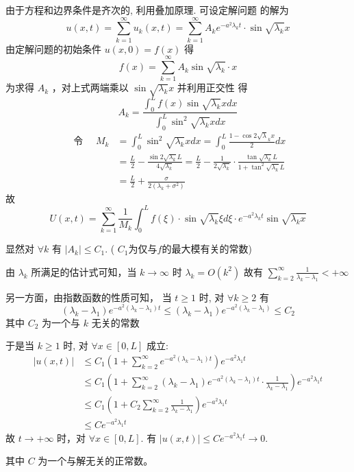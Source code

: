 \begin{questions}
\begin{solution}
由于方程和边界条件是齐次的, 利用叠加原理. 可设定解问题
的解为 $$ u(x, t)=\sum_{k=1}^{\infty} u_{k}(x, t)=\sum_{k=1}^{\infty} A_{k} e^{-a^{2} \lambda_{k} t} \cdot \sin \sqrt{\lambda_{k}} x $$
由定解问题的初始条件 $ u(x, 0)=f(x) $
得 $$ f(x)=\sum_{k=1}^{\infty} A_{k} \sin \sqrt{\lambda_{k}} \cdot x $$
为求得 $ A_{k} $ ，对上式两端乘以 $ \sin \sqrt{\lambda_{k}} x $ 并利用正交性
得 $$ A_{k}=\frac{\int_{0}^{L} f(x) \sin \sqrt{\lambda_{k}} x d x}{\int_{0}^{L} \sin ^{2} \sqrt{\lambda_{k}} x d x} $$
$$
\begin{aligned}
\text { 令 } \quad M_{k} & =\int_{0}^{L} \sin ^{2} \sqrt{\lambda_{k}} x d x=\int_{0}^{L} \frac{1-\cos 2 \sqrt{\lambda}_{k} x}{2} d x \\
& =\frac{L}{2}-\frac{\sin 2 \sqrt{\lambda_{k}} L}{4 \sqrt{\lambda_{k}}}=\frac{L}{2}-\frac{1}{2 \sqrt{\lambda_{k}}} \cdot \frac{\tan \sqrt{\lambda_{k}} L}{1+\tan ^{2} \sqrt{\lambda_{k}} L} \\
& =\frac{L}{2}+\frac{\sigma}{2\left(\lambda_{k}+\sigma^{2}\right)}
\end{aligned}
$$
故 $$ U(x, t)=\sum_{k=1}^{\infty} \frac{1}{M_{k}} \int_{0}^{L} f(\xi) \cdot \sin \sqrt{\lambda_{k}} \xi  d \xi \cdot e^{-a^{2} \lambda_{k} t} \sin \sqrt{\lambda_{k} x} $$

显然对 $ \forall k $ 有 $ \left|A_{k}\right| \leqslant C_{1} $. ( $C_1 $为仅与$f$的最大模有关的常数)

由 $ \lambda_{k} $ 所满足的估计式可知，当 $ k \rightarrow \infty $ 时  $ \lambda_{k}=O\left(k^{2}\right) $
故有 $\sum\limits_{k=2}^{\infty} \frac{1}{\lambda_{k}-\lambda_{1}}<+\infty $

另一方面，由指数函数的性质可知，
 当 $ t \geqslant 1 $ 时, 对 $ \forall k \geqslant 2 $ 有 $$ \left(\lambda_{k}-\lambda_{1}\right) e^{-a^{2}\left(\lambda_{k}-\lambda_{1}\right) t} \leqslant\left(\lambda_{k}-\lambda_{1}\right) e^{-a^{2}\left(\lambda_{k}-\lambda_{1}\right)} \leqslant C_{2} $$ 其中 $ C_{2} $ 为一个与 $k$ 无关的常数
 
于是当 $ k \geqslant 1 $ 时, 对 $ \forall x \in[0, L] $ 成立:
$$
\begin{aligned}
|u(x, t)| & \leqslant C_{1}\left(1+\sum_{k=2}^{\infty} e^{-a^{2}\left(\lambda_{k}-\lambda_{1}\right) t}\right) e^{-a^{2} \lambda_{1} t} \\
& \leqslant C_{1}\left(1+\sum_{k=2}^{\infty}\left(\lambda_{k}-\lambda_{1}\right) e^{-a^{2}\left(\lambda_{k}-\lambda_{1}\right) t} \cdot \frac{1}{\lambda_{k}-\lambda_{1}}\right) e^{-a^{2} \lambda_{1} t} \\
& \leqslant C_{1}\left(1+C_{2} \sum_{k=2}^{\infty} \frac{1}{\lambda_{k}-\lambda_{1}}\right) e^{-a^{2} \lambda_{1} t} \\
& \leqslant Ce^{-a^{2} \lambda_{1} t}
\end{aligned}
$$
故 $ t \rightarrow+\infty $ 时，对 $ \forall x \in[0, L] $. 有 $ |u(x, t)| \leqslant C e^{-a^{2} \lambda_1 t} \rightarrow 0 $.

其中 $C$ 为一个与解无关的正常数。
\end{solution}
\end{questions}